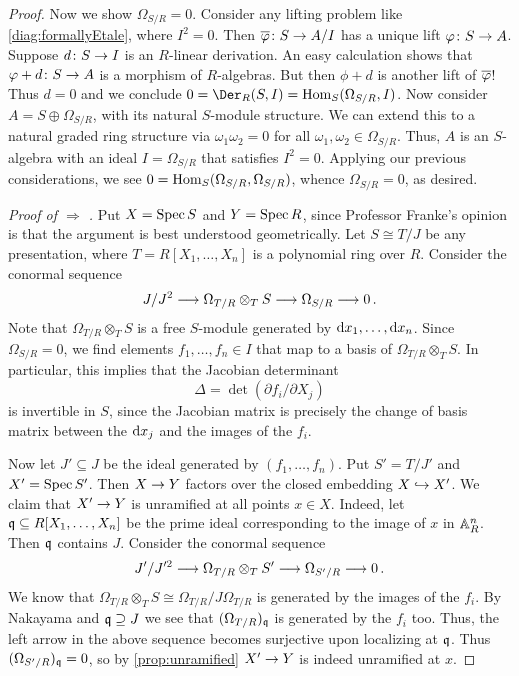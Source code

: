 \documentclass[a4paper, 10pt, oneside, DIV=9, chapterprefix=true, numbers=enddot, bibliography=totoc]{scrbook}
\begin{document}
\begin{proof}
	Now we show $\Omega_{S/R}=0$. Consider any lifting problem like \cref{diag:formallyEtale}, where $I^2=0$. Then $\ov{\phi}\colon S\morphism A/I$ has a unique lift $\phi\colon S\morphism A$. Suppose $d\colon S\morphism I$ is an $R$-linear derivation. An easy calculation shows that $\phi+d\colon S\morphism A$ is a morphism of $R$-algebras. But then $\phi+d$ is another lift of $\ov{\phi}$! Thus $d=0$ and we conclude $0=\Der_R(S,I)=\Hom_S(\Omega_{S/R},I)$. Now consider $A=S\oplus\Omega_{S/R}$, with its natural $S$-module structure. We can extend this to a natural graded ring structure via $\omega_1\omega_2=0$ for all $\omega_1,\omega_2\in \Omega_{S/R}$. Thus, $A$ is an $S$-algebra with an ideal $I=\Omega_{S/R}$ that satisfies $I^2=0$. Applying our previous considerations, we see $0=\operatorname{Hom}_S(\Omega_{S/R},\Omega_{S/R})$, whence $\Omega_{S/R}=0$, as desired.
	
	\emph{Proof of  $\Rightarrow$ .} Put $X=\operatorname{Spec} S$ and $Y=\operatorname{Spec} R$, since Professor Franke's opinion is that the argument is best understood geometrically. Let $S\cong T/J$ be any presentation, where $T=R[X_1,\dotsc,X_n]$ is a polynomial ring over $R$. Consider the conormal sequence
	\begin{equation*}
		J/J^2\morphism\Omega_{T/R}\otimes_TS\morphism\Omega_{S/R}\morphism 0\,.
	\end{equation*}
	Note that $\Omega_{T/R}\otimes_TS$ is a free $S$-module generated by $\mathrm{d} x_1,\dotsc,\mathrm{d} x_n$. Since $\Omega_{S/R}=0$, we find elements $f_1,\dotsc,f_n\in I$ that map to a basis of $\Omega_{T/R}\otimes_TS$. In particular, this implies that the Jacobian determinant
	\begin{equation*}
		\Delta=\det\left(\partial f_i/\partial X_j\right)
	\end{equation*}
	is invertible in $S$, since the Jacobian matrix is precisely the change of basis matrix between the $\mathrm{d} x_j$ and the images of the $f_i$.
	
	Now let $J'\subseteq J$ be the ideal generated by $(f_1,\dotsc,f_n)$. Put $S'=T/J'$ and $X'=\operatorname{Spec} S'$. Then $X\morphism Y$ factors over the closed embedding $X\monomorphism X'$. We claim that $X'\morphism Y$ is unramified at all points $x\in X$. Indeed, let $\mathfrak{q}\subseteq R[X_1,\dotsc,X_n]$ be the prime ideal corresponding to the image of $x$ in $\mathbb{A}_R^n$. Then $\mathfrak{q}$ contains $J$. Consider the conormal sequence
	\begin{equation*}
		J'/J'^2\morphism \Omega_{T/R}\otimes_TS'\morphism \Omega_{S'/R}\morphism 0\,.
	\end{equation*}
	We know that $\Omega_{T/R}\otimes_TS\cong \Omega_{T/R}/J\Omega_{T/R}$ is generated by the images of the $f_i$. By Nakayama and $\mathfrak{q}\supseteq J$ we see that $(\Omega_{T/R})_{\mathfrak{q}}$ is generated by the $f_i$ too. Thus, the left arrow in the above sequence becomes surjective upon localizing at $\mathfrak{q}$. Thus $(\Omega_{S'/R})_{\mathfrak{q}}=0$, so by \cref{prop:unramified} $X'\morphism Y$ is indeed unramified at $x$.
	

\end{proof}
\end{document}
